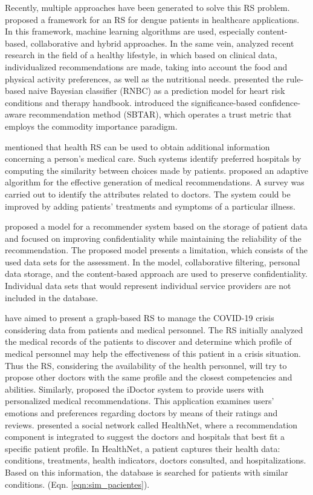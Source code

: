 \documentclass[sustainability,article,submit,pdftex,moreauthors]{Definitions/mdpi}
\begin{document}
Recently, multiple approaches have been generated to solve this RS problem. \citet{shaikh2022recommender} proposed a framework for an RS for dengue patients in healthcare applications. In this framework, machine learning algorithms are used, especially content-based, collaborative and hybrid approaches. In the same vein, \citet{vairale2019recommendation} analyzed recent research in the field of a healthy lifestyle, in which based on clinical data, individualized recommendations are made, taking into account the food and physical activity preferences, as well as the nutritional needs. \citet{fasidi2019rule} presented the rule-based naive Bayesian classifier (RNBC) as a prediction model for heart risk conditions and therapy handbook. \citet{gohari2020significance} introduced the significance-based confidence-aware recommendation method (SBTAR), which operates a trust metric that employs the commodity importance paradigm.

\citet{sahoo2019intelligence} mentioned that health RS can be used to obtain additional information concerning a person's medical care. Such systems identify preferred hospitals by computing the similarity between choices made by patients. \citet{waqar2019adaptive} proposed an adaptive algorithm for the effective generation of medical recommendations. A survey was carried out to identify the attributes related to doctors. The system could be improved by adding patients' treatments and symptoms of a particular illness.

\citet{mazeh2020personal} proposed a model for a recommender system based on the storage of patient data and focused on improving confidentiality while maintaining the reliability of the recommendation. The proposed model presents a limitation, which consists of the used data sets for the assessment. In the model, collaborative filtering, personal data storage, and the content-based approach are used to preserve confidentiality. Individual data sets that would represent individual service providers are not included in the database.

\citet{sayeb2022graph} have aimed to present a graph-based RS to manage the COVID-19 crisis considering data from patients and medical personnel. The RS initially analyzed the medical records of the patients to discover and determine which profile of medical personnel may help the effectiveness of this patient in a crisis situation. Thus the RS, considering the availability of the health personnel, will try to propose other doctors with the same profile and the closest competencies and abilities. Similarly, \citet{zhang2017idoctor} proposed the iDoctor system to provide users with personalized medical recommendations. This application examines users' emotions and preferences regarding doctors by means of their ratings and reviews. 
\citet{narducci2015recommender} presented a social network called HealthNet, where a recommendation component is integrated to suggest the doctors and hospitals that best fit a specific patient profile. In HealthNet, a patient captures their health data: conditions, treatments, health indicators, doctors consulted, and hospitalizations. Based on this information, the database is searched for patients with similar conditions. (Eqn. \ref{eqn:sim_pacientes}).
\end{document}
